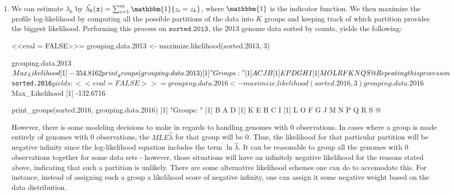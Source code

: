 \documentclass[10pt]{article}
\begin{document}
\begin{enumerate}[label = \textbf{\alph*.}]
        \item We can estimate $\lambda_k$ by $\hat{\lambda_k}(\bm{z}) = \sum_{i = 1}^m \mathbbm{1}\{z_i = z_k\}$, where $\mathbbm{1}$ is the indicator function.  We then maximize the profile log-likelihood by computing all the possible partitions of the data into $K$ groups and keeping track of which partition provides the biggest likelihood.  Performing this process on $\texttt{sorted.2013}$, the 2013 genome data sorted by counts, yields the following:
        
            <<eval = FALSE>>=
            grouping.data.2013 <- maximize.likelihood(sorted.2013, 3)
            
            grouping.data.2013$Max_Likelihood
            [1] -354.8162

            print_groups(grouping.data.2013)
            [1] "Groups: "
            [1] A C J B
            [1] E P D G H I
            [1] M O L R F K N Q S
            @
            
        Repeating this process on $\texttt{sorted.2016}$ yields:
            <<eval = FALSE>>=
            grouping.data.2016 <- maximize.likelihood(sorted.2016, 3)
            
            grouping.data.2016$Max_Likelihood
            [1] -132.6716

            print_groups(sorted.2016, grouping.data.2016)
            [1] "Groups: "
            [1] B A D
            [1] K E H C I
            [1] L O F G J M N P Q R S
            @
            
        However, there is some modeling decisions to make in regards to handling genomes with 0 observations.  In cases where a group is made entirely of genomes with 0 observations, the $MLE \hat{\lambda}$ for that group will be 0.  Thus, the likelihood for that particular partition will be negative infinity since the log-likelihood equation includes the term $\ln{\hat{\lambda}}$.  It can be reasonable to group all the genomes with 0 observations together for some data sets - however, those situations will have an infinitely negative likelihood for the reasons stated above, indicating that such a partition is unlikely.  There are some alternative likelihood schemes one can do to accomodate this.  For instance, instead of assigning such a group a likelihood score of negative infinity, one can assign it some negative weight based on the data distribution.
        

\end{enumerate}
\end{document}
